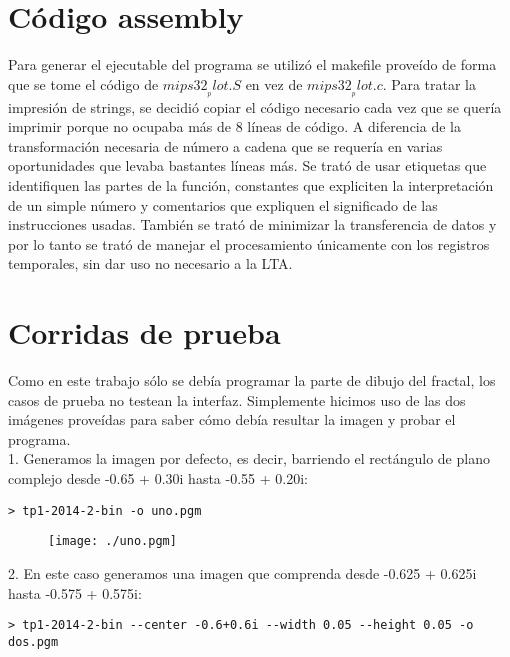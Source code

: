 \documentclass[a4paper,10pt]{article}
\begin{document}
\section{C\'odigo assembly}
Para generar el ejecutable del programa se utiliz\'o el makefile prove\'ido de forma que se tome 
el c\'odigo de $mips32__plot.S$ en vez de $mips32__plot.c$. 
Para tratar la impresi\'on de strings, se decidi\'o copiar el c\'odigo necesario cada vez que se quer\'ia 
imprimir porque no ocupaba m\'as de 8 l\'ineas de c\'odigo. A diferencia de la transformaci\'on 
necesaria de n\'umero a cadena que se requer\'ia en varias oportunidades que levaba bastantes l\'ineas m\'as. 
Se trat\'o de usar etiquetas que identifiquen las partes de la funci\'on, constantes que expliciten la interpretaci\'on de un simple n\'umero y comentarios que expliquen 
el significado de las instrucciones usadas.
Tambi\'en se trat\'o de minimizar la transferencia de datos y por lo tanto se trat\'o de manejar el 
procesamiento \'unicamente con los registros temporales, sin dar uso no necesario a la LTA. 


\pagebreak




\section{Corridas de prueba}

Como en este trabajo s\'olo se deb\'ia programar la parte de dibujo del fractal, los casos de prueba 
no testean la interfaz. Simplemente hicimos uso de las dos im\'agenes prove\'idas para saber c\'omo 
deb\'ia resultar la imagen y probar el programa.\\

1. Generamos la imagen por defecto, es decir, barriendo el rect\'angulo de plano complejo desde 
-0.65 + 0.30i hasta -0.55 + 0.20i:
\begin{verbatim}
> tp1-2014-2-bin -o uno.pgm
\end{verbatim}

\begin{figure}
\begin{center}
\texttt{[image: ./uno.pgm]}
\label{fig:Region barrida por defecto.}
\caption{}
\end{center}
\end{figure}


2. En este caso generamos una imagen que comprenda desde -0.625 + 0.625i hasta -0.575 + 0.575i:
\begin{verbatim}
> tp1-2014-2-bin --center -0.6+0.6i --width 0.05 --height 0.05 -o dos.pgm
\end{verbatim}
\end{document}
